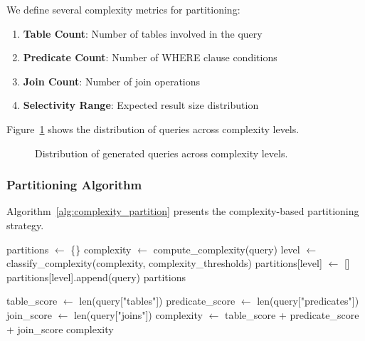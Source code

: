 We define several complexity metrics for partitioning:

\begin{enumerate}
    \item \textbf{Table Count}: Number of tables involved in the query
    \item \textbf{Predicate Count}: Number of WHERE clause conditions
    \item \textbf{Join Count}: Number of join operations
    \item \textbf{Selectivity Range}: Expected result size distribution
\end{enumerate}

Figure~\ref{fig:complexity_distribution} shows the distribution of queries across complexity levels.

\begin{figure}[h]
\centering
{}
\caption{Distribution of generated queries across complexity levels.}
\label{fig:complexity_distribution}
\end{figure}

\subsubsection{Partitioning Algorithm}

Algorithm~\ref{alg:complexity_partition} presents the complexity-based partitioning strategy.

\begin{algorithm}
\caption{Complexity-Based Query Partitioning}
\label{alg:complexity_partition}
\begin{algorithmic}[1]
    \State partitions $\gets$ \{\}
        \State complexity $\gets$ compute\_complexity(query)
        \State level $\gets$ classify\_complexity(complexity, complexity\_thresholds)
            \State partitions[level] $\gets$ []
        \EndIf
        \State partitions[level].append(query)
    \EndFor
    \State \Return partitions
\EndProcedure

    \State table\_score $\gets$ len(query["tables"])
    \State predicate\_score $\gets$ len(query["predicates"])
    \State join\_score $\gets$ len(query["joins"])
    \State complexity $\gets$ table\_score + predicate\_score + join\_score
    \State \Return complexity
\EndProcedure
\end{algorithmic}
\end{algorithm}

